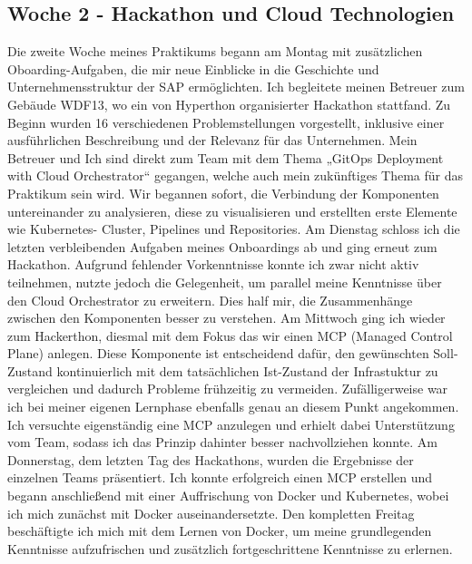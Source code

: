\subsection{Woche 2 - Hackathon und Cloud Technologien}
Die zweite Woche meines Praktikums begann am Montag mit zusätzlichen
Oboarding-Aufgaben, die mir neue Einblicke in die Geschichte und
Unternehmensstruktur der SAP ermöglichten. Ich begleitete meinen Betreuer zum
Gebäude WDF13, wo ein von Hyperthon organisierter Hackathon stattfand. Zu
Beginn wurden 16 verschiedenen Problemstellungen vorgestellt, inklusive einer
ausführlichen Beschreibung und der Relevanz für das Unternehmen. Mein Betreuer
und Ich sind direkt zum Team mit dem Thema „GitOps Deployment with Cloud
Orchestrator“ gegangen, welche auch mein zukünftiges Thema für das Praktikum
sein wird. Wir begannen sofort, die Verbindung der Komponenten untereinander zu
analysieren, diese zu visualisieren und erstellten erste Elemente wie Kubernetes-
Cluster, Pipelines und Repositories.
Am Dienstag schloss ich die letzten verbleibenden Aufgaben meines Onboardings ab
und ging erneut zum Hackathon. Aufgrund fehlender Vorkenntnisse konnte ich zwar
nicht aktiv teilnehmen, nutzte jedoch die Gelegenheit, um parallel meine Kenntnisse
über den Cloud Orchestrator zu erweitern. Dies half mir, die Zusammenhänge
zwischen den Komponenten besser zu verstehen.
Am Mittwoch ging ich wieder zum Hackerthon, diesmal mit dem Fokus das wir einen
MCP (Managed Control Plane) anlegen. Diese Komponente ist entscheidend dafür,
den gewünschten Soll-Zustand kontinuierlich mit dem tatsächlichen Ist-Zustand der
Infrastuktur zu vergleichen und dadurch Probleme frühzeitig zu vermeiden.
Zufälligerweise war ich bei meiner eigenen Lernphase ebenfalls genau an diesem
Punkt angekommen. Ich versuchte eigenständig eine MCP anzulegen und erhielt
dabei Unterstützung vom Team, sodass ich das Prinzip dahinter besser
nachvollziehen konnte. Am Donnerstag, dem letzten Tag des Hackathons, wurden
die Ergebnisse der einzelnen Teams präsentiert. Ich konnte erfolgreich einen MCP
erstellen und begann anschließend mit einer Auffrischung von Docker und
Kubernetes, wobei ich mich zunächst mit Docker auseinandersetzte. Den
kompletten Freitag beschäftigte ich mich mit dem Lernen von Docker, um meine
grundlegenden Kenntnisse aufzufrischen und zusätzlich fortgeschrittene Kenntnisse
zu erlernen.

